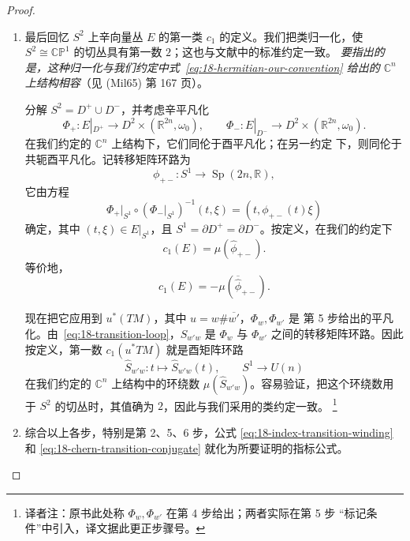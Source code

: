 \begin{proof}
\begin{enumerate}[label=\arabic*.]
\item {} 最后回忆 $S^2$ 上辛向量丛 $E$ 的第一\personChern{}类
$c_1$ 的定义。我们把\personChern{}类归一化，使
$S^2\cong\mathbb{CP}^1$ 的切丛具有第一\personChern{}数 $2$；这也与文献中的标准约定一致。
\emph{要指出的是，这种归一化与我们约定中式~\eqref{eq:18-hermitian-our-convention}
给出的 $\mathbb C^n$ 上\personHermitian{}结构相容}（见 (Mil65) 第 167 页）。

分解 $S^2=D^+\cup D^-$，并考虑辛平凡化
\[
 \Phi_+:E|_{D^+}\to D^2\times(\mathbb R^{2n},\omega_0),\qquad
 \Phi_-:E|_{D^-}\to D^2\times(\mathbb R^{2n},\omega_0).
\]
在我们约定的 $\mathbb C^n$ 上\personHermitian{}结构下，它们同伦于酉平凡化；在另一约定
下，则同伦于共轭酉平凡化。记转移矩阵环路为
\[
 \phi_{+-}:S^1\longrightarrow\operatorname{Sp}(2n,\mathbb R),
\]
它由方程
\[
 \Phi_+|_{S^1}\circ(\Phi_-|_{S^1})^{-1}(t,\xi)
 =(t,\phi_{+-}(t)\xi)
\]
确定，其中 $(t,\xi)\in E|_{S^1}$，且
$S^1=\partial D^+=\partial D^-$。按定义，在我们的约定下
\begin{equation}
 c_1(E)=\mu(\widehat\phi_{+-}).
 \label{eq:18-chern-transition-our-convention}
\end{equation}
等价地，
\begin{equation}
 c_1(E)=-\mu(\overline{\widehat\phi}_{+-}).
 \label{eq:18-chern-transition-conjugate}
\end{equation}

现在把它应用到 $u^*(TM)$，其中 $u=w\#\overline{w'}$，$\Phi_w,\Phi_{w'}$ 是
第 5 步给出的平凡化。由~\eqref{eq:18-transition-loop}，$S_{w'w}$ 是
$\Phi_w$ 与 $\Phi_{w'}$ 之间的转移矩阵环路。因此按定义，第一\personChern{}数
$c_1(u^*TM)$ 就是酉矩阵环路
\[
 \widehat S_{w'w}:t\longmapsto\widehat S_{w'w}(t),
 \qquad S^1\longrightarrow U(n)
\]
在我们约定的 $\mathbb C^n$ 上\personHermitian{}结构中的环绕数
$\mu(\widehat S_{w'w})$。容易验证，把这个环绕数用于 $S^2$ 的切丛时，其值确为
$2$，因此与我们采用的\personChern{}类约定一致。
\footnote{译者注：原书此处称 $\Phi_w,\Phi_{w'}$ 在第 4 步给出；两者实际在第 5 步
“标记条件”中引入，译文据此更正步骤号。}

\item {} 综合以上各步，特别是第 2、5、6 步，公式
\eqref{eq:18-index-transition-winding} 和
\eqref{eq:18-chern-transition-conjugate} 就化为所要证明的指标公式。
\end{enumerate}
\end{proof}
